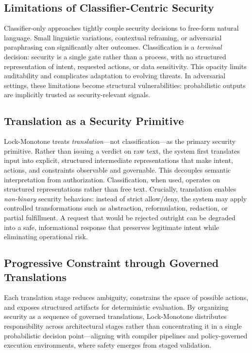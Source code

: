 \documentclass[conference]{IEEEtran}
\begin{document}
\subsection{Limitations of Classifier-Centric Security}
Classifier-only approaches tightly couple security decisions to free-form
natural language. Small linguistic variations, contextual reframing, or
adversarial paraphrasing can significantly alter outcomes. Classification
is a \emph{terminal} decision: security is a single gate rather than a
process, with no structured representation of intent, requested actions,
or data sensitivity. This opacity limits auditability and complicates
adaptation to evolving threats. In adversarial settings, these
limitations become structural vulnerabilities: probabilistic outputs are
implicitly trusted as security-relevant signals.

\subsection{Translation as a Security Primitive}
Lock-Monotone treats \emph{translation}---not classification---as the
primary security primitive. Rather than issuing a verdict on raw text, the
system first translates input into explicit, structured intermediate
representations that make intent, actions, and constraints observable and
governable. This decouples semantic interpretation from authorization.
Classification, when used, operates on structured representations rather
than free text. Crucially, translation enables \emph{non-binary} security
behaviors: instead of strict allow/deny, the system may apply controlled
transformations such as abstraction, reformulation, redaction, or partial
fulfillment. A request that would be rejected outright can be degraded
into a safe, informational response that preserves legitimate intent while
eliminating operational risk.

\subsection{Progressive Constraint through Governed Translations}
Each translation stage reduces ambiguity, constrains the space of possible
actions, and exposes structured artifacts for deterministic evaluation. By
organizing security as a sequence of governed translations, Lock-Monotone
distributes responsibility across architectural stages rather than
concentrating it in a single probabilistic decision point---aligning with
compiler pipelines and policy-governed execution environments, where
safety emerges from staged validation.
\end{document}
